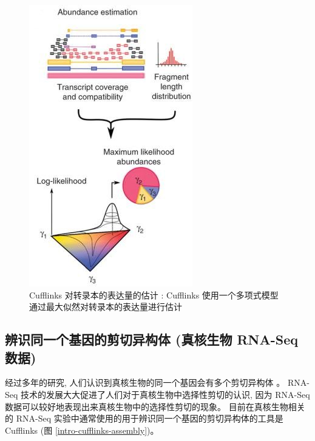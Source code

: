 \begin{figure}[!t]
\centering
\includegraphics[height=0.5\textheight]{figures/cufflinks-abundance.jpg}
\caption[Cufflinks 对转录本的表达量的估计 \cite{cufflinks.2010}]
{Cufflinks 对转录本的表达量的估计 \cite{cufflinks.2010}: 
Cufflinks 使用一个多项式模型通过最大似然对转录本的表达量进行估计}
\label{intro-cufflinks-abundance}
\end{figure}

\subsection{辨识同一个基因的剪切异构体 (真核生物 RNA-Seq 数据)}
经过多年的研究, 人们认识到真核生物的同一个基因会有多个剪切异构体 
\cite{gilbert1978genes, rosenfeld1982calcitonin, early1980two, 
citeulike:447573, modrek2002genomic}。 
RNA-Seq 技术的发展大大促进了人们对于真核生物中选择性剪切的认识, 
因为 RNA-Seq 数据可以较好地表现出来真核生物中的选择性剪切的现象。 
目前在真核生物相关的 RNA-Seq 实验中通常使用的用于辨识同一个基因的剪切异构体的工具是 
Cufflinks \cite{cufflinks.2010} (图 \ref{intro-cufflinks-assembly})。

